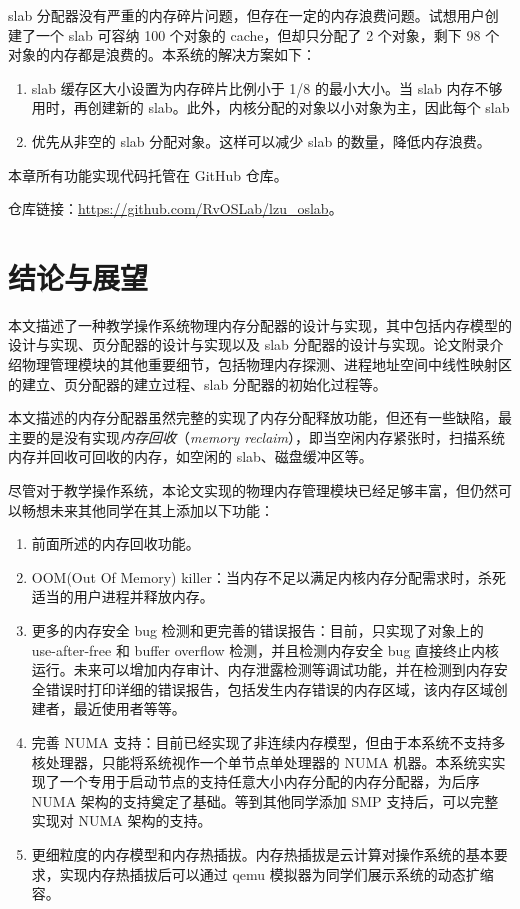 \documentclass[AutoFakeBold]{LZUThesis}
\begin{document}
\begin{sloppypar}
slab
分配器没有严重的内存碎片问题，但存在一定的内存浪费问题。试想用户创建了一个
slab 可容纳 100 个对象的 cache，但却只分配了 2 个对象，剩下 98
个对象的内存都是浪费的。本系统的解决方案如下：

\begin{enumerate}
\def\labelenumi{\arabic{enumi}.}
\item
  slab 缓存区大小设置为内存碎片比例小于 1/8 的最小大小。当 slab
  内存不够用时，再创建新的
  slab。此外，内核分配的对象以小对象为主，因此每个 slab
\item
  优先从非空的 slab 分配对象。这样可以减少 slab 的数量，降低内存浪费。
\end{enumerate}

本章所有功能实现代码托管在 GitHub 仓库。

仓库链接：\href{https://github.com/RvOSLab/lzu_oslab}{https://github.com/RvOSLab/lzu\_oslab}。

\chapter{结论与展望}

本文描述了一种教学操作系统物理内存分配器的设计与实现，其中包括内存模型的设计与实现、页分配器的设计与实现以及
slab
分配器的设计与实现。论文附录介绍物理管理模块的其他重要细节，包括物理内存探测、进程地址空间中线性映射区的建立、页分配器的建立过程、slab
分配器的初始化过程等。

本文描述的内存分配器虽然完整的实现了内存分配释放功能，但还有一些缺陷，最主要的是没有实现\emph{内存回收}（\emph{memory
reclaim}），即当空闲内存紧张时，扫描系统内存并回收可回收的内存，如空闲的
slab、磁盘缓冲区等。

尽管对于教学操作系统，本论文实现的物理内存管理模块已经足够丰富，但仍然可以畅想未来其他同学在其上添加以下功能：

\begin{enumerate}
\def\labelenumi{\arabic{enumi}.}
\item
  前面所述的内存回收功能。
\item
  OOM(Out Of Memory)
  killer：当内存不足以满足内核内存分配需求时，杀死适当的用户进程并释放内存。
\item
  更多的内存安全 bug 检测和更完善的错误报告：目前，只实现了对象上的
  use-after-free 和 buffer overflow 检测，并且检测内存安全 bug
  直接终止内核运行。未来可以增加内存审计、内存泄露检测等调试功能，并在检测到内存安全错误时打印详细的错误报告，包括发生内存错误的内存区域，该内存区域创建者，最近使用者等等。
\item
  完善 NUMA
  支持：目前已经实现了非连续内存模型，但由于本系统不支持多核处理器，只能将系统视作一个单节点单处理器的
  NUMA
  机器。本系统实实现了一个专用于启动节点的支持任意大小内存分配的内存分配器，为后序
  NUMA 架构的支持奠定了基础。等到其他同学添加 SMP 支持后，可以完整实现对
  NUMA 架构的支持。
\item
  更细粒度的内存模型和内存热插拔。内存热插拔是云计算对操作系统的基本要求，实现内存热插拔后可以通过
  qemu 模拟器为同学们展示系统的动态扩缩容。
\end{enumerate}






\end{sloppypar}
\end{document}
